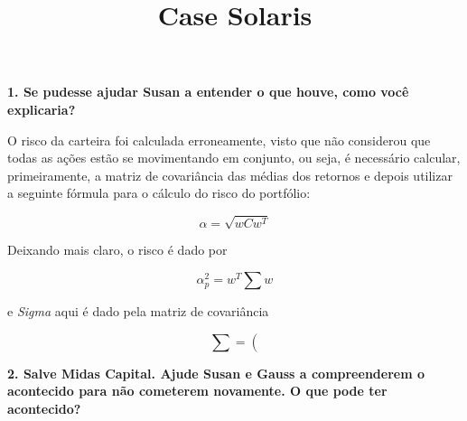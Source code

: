 \documentclass[12pt]{article}
\begin{document}
\title{Case Solaris}
\maketitle

\textbf{1. Se pudesse ajudar Susan a entender o que houve, como você explicaria?}

O risco da carteira foi calculada erroneamente, visto que não considerou que todas as ações estão se movimentando em conjunto, ou seja, é necessário calcular, primeiramente, a  matriz de covariância das médias dos retornos e depois utilizar a seguinte fórmula para o cálculo do risco do portfólio:

$$
\alpha = \sqrt{wCw^T}
$$

Deixando mais claro, o risco é dado por

$$
\alpha_p^2 = w^T \sum{w}
$$

e \textit{Sigma} aqui é dado pela matriz de covariância

$$
\sum = \left(
$$


\textbf{2. Salve Midas Capital. Ajude Susan e Gauss a compreenderem o acontecido para não cometerem novamente. O que pode ter acontecido?}
\end{document}
